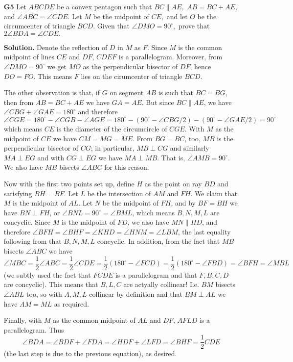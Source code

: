 \documentclass[11pt]{article}
\newcommand{\<}{\langle}
\renewcommand{\>}{\rangle}
\begin{document}
\begin{enumerate}
	\item[\textbf{G5}] Let $ABCDE$ be a convex pentagon such that $BC \parallel AE,$ $AB = BC +  AE,$ and $\angle ABC = \angle CDE.$ Let $M$ be the midpoint of $CE,$ and let $O$ be the circumcenter of triangle $BCD.$ Given that $\angle DMO = 90^{\circ},$ prove that $2 \angle BDA = \angle CDE.$
	
	\textbf{Solution.} Denote the reflection of $D$ in $M$ as $F$. Since $M$ is the common midpoint of lines $CE$ and $DF$, $CDEF$ is a parallelogram. Moreover, from $\angle DMO=90^{\circ}$ we get $MO$ as the perpendicular bisector of $DF$, hence $DO=FO$. This means $F$ lies on the cirumcenter of triangle $BCD$. 
	
	The other observation is that, if $G$ on segment $AB$ is such that $BC=BG$, then from $AB=BC+AE$ we have $GA=AE$. But since $BC\parallel AE$, we have $\angle CBG+\angle GAE=180^{\circ}$ and therefore 
	\[
	\angle CGE = 180^{\circ} - \angle CGB - \angle AGE = 180^{\circ} - (90^{\circ} - \angle CBG/2) - (90^{\circ} - \angle GAE / 2) = 90^{\circ}
	\]
	which means $CE$ is the diameter of the circumcircle of $CGE$. With $M$ as the midpoint of $CE$ we have $CM=MG=ME$. From $BG=BC$, too, $MB$ is the perpendicular bisector of $CG$; in particular, $MB\perp CG$ and similarly $MA\perp EG$ and with $CG\perp EG$ we have $MA\perp MB$. That is, $\angle AMB=90^{\circ}$. We also have $MB$ bisects $\angle ABC$ for this reason. 
	
	Now with the first two points set up, define $H$ as the point on ray $BD$ and satisfying $BH=BF$. Let $L$ be the intersection of $AM$ and $FH$. We claim that $M$ is the midpoint of $AL$. 
	Let $N$ be the midpoint of $FH$, and by $BF=BH$ we have $BN\perp FH$, or $\angle BNL=90^{\circ} = \angle BML$, which means $B, N, M, L$ are concyclic. Since $M$ is the midpoint of $FD$, we also have $MN\parallel HD$, and therefore $\angle BFH=\angle BHF=\angle KHD=\angle HNM = \angle LBM$, the last equality following from that $B, N, M, L$ concyclic. In addition, from the fact that $MB$ bisects $\angle ABC$ we have \[\angle MBC=\frac 12 \angle ABC=\frac 12 \angle CDE = \frac 12(180^{\circ}  - \angle FCD)
	=\frac 12(180^{\circ}  - \angle FBD) = \angle BFH=\angle MBL
	\]
	(we subtly used the fact that $FCDE$ is a parallelogram and that $F, B, C, D$ are concyclic). 
	This means that $B, L, C$ are actyally collinear! I.e. $BM$ bisects $\angle ABL$ too, so with $A, M, L$ collinear by definition and that $BM\perp AL$ we have $AM=ML$ as required. 
	
	Finally, with $M$ as the common midpoint of $AL$ and $DF$, $AFLD$ is a parallelogram. Thus 
	\[\angle BDA=\angle BDF+\angle FDA = \angle HDF + \angle LFD = \angle BHF = \frac 12 CDE
	\]
	(the last step is due to the previous equation), as desired. 
	

\end{enumerate}
\end{document}
